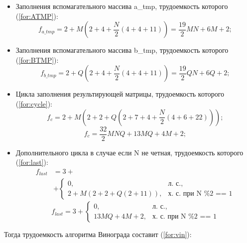 \begin{itemize}
	\item Заполнения вспомагательного массива a\_tmp, трудоемкость которого (\ref{for:ATMP}):
	\begin{equation}
		\label{for:ATMP}
		f_{a\_tmp} = 2 + M (2 + 4 + \frac{N}{2} (4 + 4 + 11)) = \frac{19}{2}MN + 6M + 2;
	\end{equation}
	
	\item Заполнения вспомагательного массива b\_tmp, трудоемкость которого (\ref{for:BTMP}):
	\begin{equation}
		\label{for:BTMP}
		f_{b\_tmp} = 2 + Q (2 + 4 + \frac{N}{2} (4 + 4 + 11)) = \frac{19}{2}QN + 6Q + 2;
	\end{equation}
	
	\item Цикла заполнения результирующей матрицы, трудоемкость которого (\ref{for:cycle}):
	\begin{equation}
		\label{for:cycle0}
		f_{c} = 2 + M (2 + 2 + Q (2 + 7 + 4 + \frac{N}{2} (4 + 6 + 22)));
	\end{equation}
	\begin{equation}
		\label{for:cycle}
		f_{c} = \frac{32}{2}MNQ + 13MQ + 4M + 2;
	\end{equation}
	
	\item Дополнительного цикла в случае если N не четная, трудоемкость которого (\ref{for:last}):
	\begin{equation}
	\begin{aligned}
		\label{for:last0}
		f_{last} &= 3 + \\
		&+ \begin{cases}
			0, & \text{л. с.,}\\
			2 + M(2 + 2 + Q(2 + 11)), & \text{х. с. при N \% 2 == 1}
		\end{cases}
	\end{aligned}
	\end{equation}
	\begin{equation}
		\label{for:last}
		f_{last} = 3 + \begin{cases}
			0, & \text{л. с.,}\\
			13MQ + 4M + 2, & \text{х. с. при N \% 2 == 1}
		\end{cases}
	\end{equation}
\end{itemize}

Тогда трудоемкость алгоритма Винограда составит (\ref{for:vin}):

